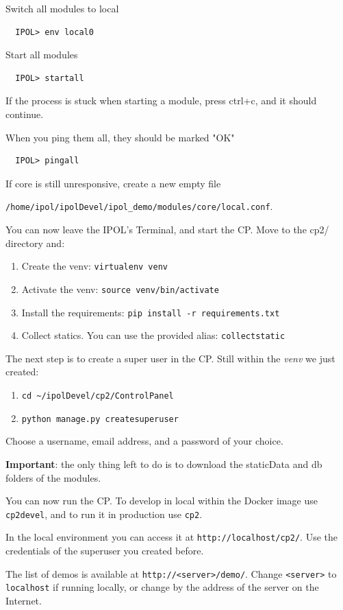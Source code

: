 \documentclass[a4paper,12pt]{article}
\begin{document}
Switch all modules to local
\begin{verbatim}
  IPOL> env local0
\end{verbatim}

Start all modules
\begin{verbatim}
  IPOL> startall
\end{verbatim}
If the process is stuck when starting a module, press ctrl+c, and it should continue.

When you ping them all, they should be marked "OK"
\begin{verbatim}
  IPOL> pingall
\end{verbatim}
If core is still unresponsive, create a new empty file

{\tt /home/ipol/ipolDevel/ipol\_demo/modules/core/local.conf}.

You can now leave the IPOL's Terminal, and start the CP.
Move to the cp2/ directory and:

\begin{enumerate}
  \item Create the venv: {\tt virtualenv venv}
  \item Activate the venv: {\tt source venv/bin/activate}
  \item Install the requirements: {\tt pip install -r requirements.txt}
  \item Collect statics. You can use the provided alias: {\tt collectstatic}
\end{enumerate}

The next step is to create a super user in the CP. Still within the \emph{venv} we just created:
\begin{enumerate}
  \item {\tt cd \textasciitilde/ipolDevel/cp2/ControlPanel}
  \item {\tt python manage.py createsuperuser}
\end{enumerate}

Choose a username, email address, and a password of your choice.

\textbf{Important}: the only thing left to do is to download the staticData and db folders of the modules.

You can now run the CP. To develop in local within the Docker image use {\tt cp2devel}, and to run it in production use {\tt cp2}.

In the local environment you can access it at {\tt http://localhost/cp2/}. Use the credentials of the superuser you created
before.

The list of demos is available at {\tt http://<server>/demo/}. Change {\tt <server>} to {\tt localhost} if running locally, or change by the address of the server on the Internet.
\end{document}
